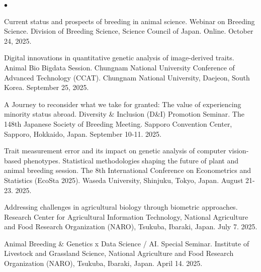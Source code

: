 \documentclass[margin,line,10pt]{res}
\newenvironment{list2}{
  \begin{list}{$\bullet$}{%
      \setlength{\itemsep}{0in}
      \setlength{\parsep}{0in} \setlength{\parskip}{0in}
      \setlength{\topsep}{0in} \setlength{\partopsep}{0in} 
      \setlength{\leftmargin}{0.2in}}}{\end{list}}
\begin{document}
\begin{resume}
\begin{list2}
  \vspace{0.5cm}

  \item [{\bf 52}.] Current status and prospects of breeding in animal science. Webinar on Breeding Science. Division of Breeding Science, Science Council of Japan. Online. October 24, 2025. %

  \vspace{0.5cm}

   \item [{\bf 51}.] Digital innovations in quantitative genetic analysis of image-derived traits. Animal Bio Bigdata Session. Chungnam National University Conference of Advanced Technology (CCAT). Chungnam National University, Daejeon, South Korea. September 25, 2025. 


   \vspace{0.5cm}

   \item [{\bf 50}.]  A Journey to reconsider what we take for granted: The value of experiencing minority status abroad. Diversity \& Inclusion (D\&I) Promotion Seminar. The 148th Japanese Society of Breeding Meeting. Sapporo Convention Center, Sapporo, Hokkaido, Japan. September 10-11. 2025. %


  \vspace{0.5cm}

  \item [{\bf 49}.] Trait measurement error and its impact on genetic analysis of computer vision-based phenotypes. Statistical methodologies shaping the future of plant and animal breeding session. The 8th International Conference on Econometrics and Statistics (EcoSta 2025). Waseda University, Shinjuku, Tokyo, Japan. August 21-23. 2025. 

  \vspace{0.5cm}

  \item [{\bf 48}.]  Addressing challenges in agricultural biology through biometric approaches.  Research Center for Agricultural Information Technology, National Agriculture and Food Research Organization (NARO), Tsukuba, Ibaraki, Japan. July 7. 2025.  %


  \vspace{0.5cm}

  \item [{\bf 47}.]  Animal Breeding \& Genetics x Data Science / AI. Special Seminar. Institute of Livestock and Grassland Science, National Agriculture and Food Research Organization (NARO), Tsukuba, Ibaraki, Japan. April 14. 2025. %



\end{list2}
\end{resume}
\end{document}

